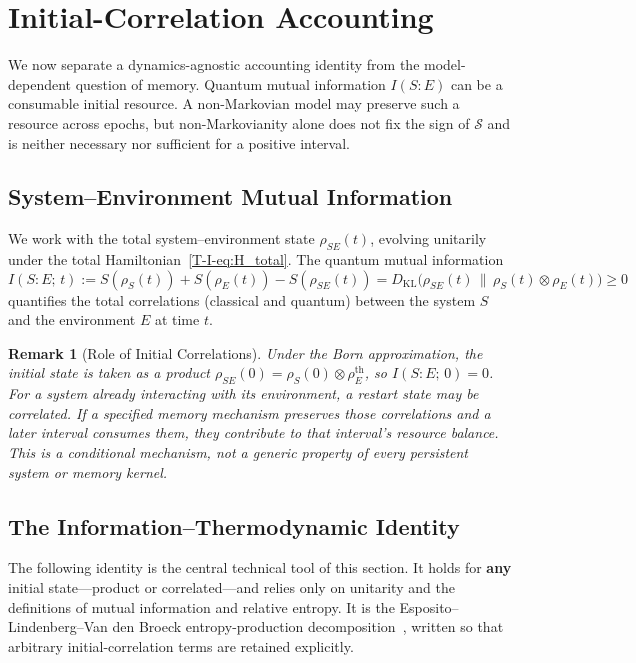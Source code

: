 \documentclass[12pt,a4paper,openany]{book}
\newtheorem{remark}[theorem]{Remark}
\begin{document}
\section{Initial-Correlation Accounting}
\label{T-I-sec:advantage}

We now separate a dynamics-agnostic accounting identity from the
model-dependent question of memory.  Quantum mutual information
$I(S{:}E)$ can be a consumable initial resource.  A non-Markovian model
may preserve such a resource across epochs, but non-Markovianity alone
does not fix the sign of $\mathcal S$ and is neither necessary nor
sufficient for a positive interval.

\subsection{System--Environment Mutual Information}

We work with the total system--environment state
$\rho_{SE}(t)$, evolving unitarily under the total
Hamiltonian~\eqref{T-I-eq:H_total}.
The quantum mutual information
\begin{equation}
\label{T-I-eq:mutual_info}
I(S{:}E;\, t) := S(\rho_S(t)) + S(\rho_E(t))
  - S(\rho_{SE}(t))
= D_{\mathrm{KL}}\!\bigl(\rho_{SE}(t) \,\big\|\,
  \rho_S(t) \otimes \rho_E(t)\bigr)
\geq 0
\end{equation}
quantifies the total correlations (classical and quantum)
between the system $S$ and the environment $E$ at time $t$.

\begin{remark}[Role of Initial Correlations]
\label{T-I-rem:initial_corr}
Under the Born approximation, the initial state is taken as a
product $\rho_{SE}(0) = \rho_S(0) \otimes \rho_E^{\mathrm{th}}$,
so $I(S{:}E;\, 0) = 0$.
For a system already interacting with its environment, a restart state
\emph{may} be correlated.  If a specified memory mechanism preserves
those correlations and a later interval consumes them, they contribute
to that interval's resource balance.  This is a conditional mechanism,
not a generic property of every persistent system or memory kernel.
\end{remark}

\subsection{The Information--Thermodynamic Identity}

The following identity is the central technical tool of this
section.
It holds for \textbf{any} initial state---product or
correlated---and relies only on unitarity and the definitions
of mutual information and relative entropy.
It is the Esposito--Lindenberg--Van den Broeck entropy-production
decomposition~\cite{EspositoLindenbergVandenBroeck2010}, written so
that arbitrary initial-correlation terms are retained explicitly.
\end{document}

